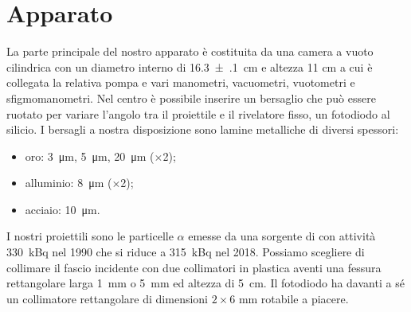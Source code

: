 \section{Apparato}
La parte principale del nostro apparato è costituita da una camera a vuoto cilindrica con un diametro interno di  \SI{16.3(1)}{cm} e altezza 11 cm a cui è collegata la relativa pompa e vari 
manometri, vacuometri, vuotometri e sfigmomanometri. 
Nel centro è possibile inserire un bersaglio che può essere ruotato per variare l'angolo tra il proiettile e il rivelatore fisso, un fotodiodo al silicio.
I bersagli a nostra disposizione sono lamine metalliche di diversi spessori: 
\begin{itemize}

\item oro: \SI{3}{\micro m}, \SI{5}{\micro m}, \SI{20}{\micro m} ($\times$2);
\item alluminio: \SI{8}{\micro m} ($\times$2);
\item acciaio: \SI{10}{\micro m}.

\end{itemize} 

I nostri proiettili sono le particelle $\alpha$ emesse da una sorgente di \am{} con attività \SI{330}{kBq} nel 1990 che si riduce a \SI{315}{kBq} nel 2018.
Possiamo scegliere di collimare il fascio incidente con due collimatori in plastica aventi una fessura rettangolare larga \SI{1}{mm} o \SI{5}{mm} ed altezza di \SI{5}{cm}.
Il fotodiodo ha davanti a sé un collimatore rettangolare di dimensioni $2\times 6$\! mm rotabile a piacere.

